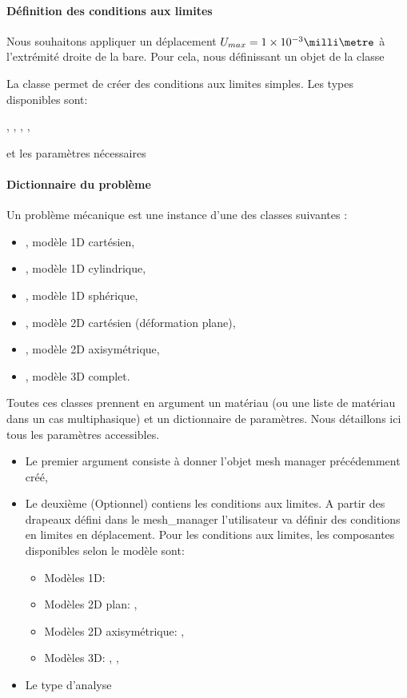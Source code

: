 \documentclass[10pt]{book}
\begin{document}
\paragraph{Définition des conditions aux limites} Nous souhaitons appliquer un déplacement $U_{max}=1 \times 10^{-3}\milli\metre$ à l'extrémité droite de la bare. Pour cela, nous définissant un objet de la classe 
\begin{figure}[h!]

\end{figure}

La classe  permet de créer des conditions aux limites simples. Les types disponibles sont:
\begin{center}
, , , , 
\end{center}
et les paramètres nécessaires 
\paragraph{Dictionnaire du problème} Un problème mécanique est une instance d'une des classes suivantes :
\begin{itemize}
\item {}, modèle 1D cartésien,
\item {}, modèle 1D cylindrique,
\item {}, modèle 1D sphérique,
\item {}, modèle 2D cartésien (déformation plane),
\item {}, modèle 2D axisymétrique,
\item {}, modèle 3D complet.
\end{itemize}
Toutes ces classes prennent en argument un matériau (ou une liste de matériau dans un cas multiphasique) et un dictionnaire de paramètres. Nous détaillons ici tous les paramètres accessibles.
\begin{itemize}
\item Le premier argument consiste à donner l'objet mesh manager précédemment créé,
\item Le deuxième (Optionnel) contiens les conditions aux limites. A partir des drapeaux défini dans le mesh\_manager l'utilisateur va définir des conditions en limites en déplacement. Pour les conditions aux limites, les composantes disponibles selon le modèle sont:
\begin{itemize}
\item Modèles 1D: 
\item Modèles 2D plan: , 
\item Modèles 2D axisymétrique: , 
\item Modèles 3D: , , 
\end{itemize}
\item Le type d'analyse
\end{itemize}
\end{document}

